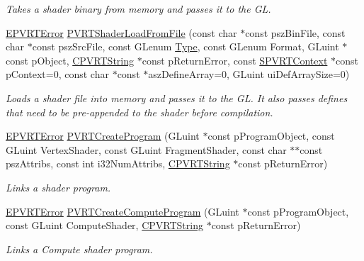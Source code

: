 \begin{DoxyCompactItemize}
\begin{DoxyCompactList}\small\item\em Takes a shader binary from memory and passes it to the G\+L. \end{DoxyCompactList}\item 
\hyperlink{_p_v_r_t_error_8h_a9e837ff1a83f3a5f332bc4cc78454608}{E\+P\+V\+R\+T\+Error} \hyperlink{group___a_p_i___o_g_l_e_s2_ga568b6b49364c381f51f873e86d125138}{P\+V\+R\+T\+Shader\+Load\+From\+File} (const char $\ast$const psz\+Bin\+File, const char $\ast$const psz\+Src\+File, const G\+Lenum \hyperlink{struct_type}{Type}, const G\+Lenum Format, G\+Luint $\ast$const p\+Object, \hyperlink{class_c_p_v_r_t_string}{C\+P\+V\+R\+T\+String} $\ast$const p\+Return\+Error, const \hyperlink{struct_s_p_v_r_t_context}{S\+P\+V\+R\+T\+Context} $\ast$const p\+Context=0, const char $\ast$const $\ast$asz\+Define\+Array=0, G\+Luint ui\+Def\+Array\+Size=0)
\begin{DoxyCompactList}\small\item\em Loads a shader file into memory and passes it to the G\+L. It also passes defines that need to be pre-\/appended to the shader before compilation. \end{DoxyCompactList}\item 
\hyperlink{_p_v_r_t_error_8h_a9e837ff1a83f3a5f332bc4cc78454608}{E\+P\+V\+R\+T\+Error} \hyperlink{group___a_p_i___o_g_l_e_s2_ga47ba5cd4baf3d8541e222081b521d5c6}{P\+V\+R\+T\+Create\+Program} (G\+Luint $\ast$const p\+Program\+Object, const G\+Luint Vertex\+Shader, const G\+Luint Fragment\+Shader, const char $\ast$$\ast$const psz\+Attribs, const int i32\+Num\+Attribs, \hyperlink{class_c_p_v_r_t_string}{C\+P\+V\+R\+T\+String} $\ast$const p\+Return\+Error)
\begin{DoxyCompactList}\small\item\em Links a shader program. \end{DoxyCompactList}\item 
\hyperlink{_p_v_r_t_error_8h_a9e837ff1a83f3a5f332bc4cc78454608}{E\+P\+V\+R\+T\+Error} \hyperlink{group___a_p_i___o_g_l_e_s2_ga37b1db2e14e571b0d1d7b42bce5602bf}{P\+V\+R\+T\+Create\+Compute\+Program} (G\+Luint $\ast$const p\+Program\+Object, const G\+Luint Compute\+Shader, \hyperlink{class_c_p_v_r_t_string}{C\+P\+V\+R\+T\+String} $\ast$const p\+Return\+Error)
\begin{DoxyCompactList}\small\item\em Links a Compute shader program. \end{DoxyCompactList}\item 
$$
\end{DoxyCompactItemize}
